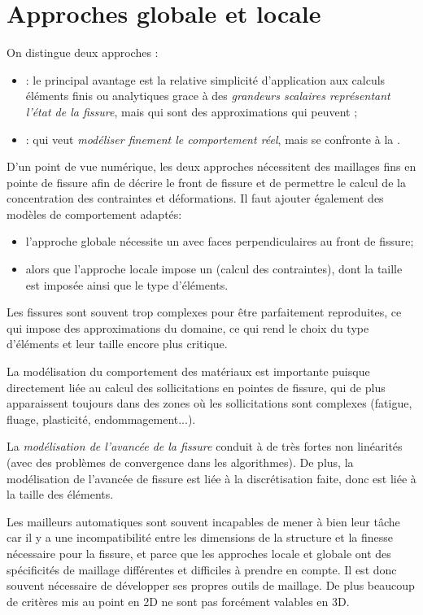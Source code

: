 \section{Approches globale et locale}
On distingue deux approches :
\begin{itemize}
   \item {}: le principal avantage est la relative simplicité d'application
	aux calculs éléments finis ou analytiques grace à des \emph{grandeurs scalaires représentant l'état de
	la fissure}, mais qui sont des approximations qui peuvent ;
   \item {}: qui veut \emph{modéliser finement le comportement réel},
	mais se confronte à la .
\end{itemize}
\medskipvm
D'un point de vue numérique, les deux approches nécessitent des maillages fins en pointe de
fissure afin de décrire le front de fissure et de permettre le calcul de la concentration des contraintes
et déformations.
Il faut ajouter également des modèles de comportement adaptés:
\begin{itemize}
   \item l'approche globale nécessite un  avec faces perpendiculaires
	au front de fissure;
   \item alors que l'approche locale impose un  (calcul des contraintes), dont la
	taille est imposée ainsi que le type d'éléments.
\end{itemize}
\medskipvm
Les fissures sont souvent trop complexes pour être parfaitement reproduites, ce qui impose
des approximations du domaine, ce qui rend le choix du type d'éléments et leur taille encore
plus critique.

La modélisation du comportement des matériaux est importante puisque directement
liée au calcul des sollicitations en pointes de fissure, qui de plus apparaissent toujours dans
des zones où les sollicitations sont complexes (fatigue, fluage, plasticité, endommagement...).

La \emph{modélisation de l'avancée de la fissure} conduit à de très fortes non linéarités
(avec des problèmes de convergence dans les algorithmes).
De plus, la modélisation de l'avancée de fissure est liée à la discrétisation faite, donc est
liée à la taille des éléments.

Les mailleurs automatiques sont souvent incapables de mener à bien leur tâche car
il y a une incompatibilité entre les dimensions de la structure et la finesse nécessaire
pour la fissure, et parce que les approches locale et globale ont des spécificités de maillage
différentes et difficiles à prendre en compte.
Il est donc souvent nécessaire de développer ses propres outils de maillage.
De plus beaucoup de critères mis au point en 2D ne sont pas forcément valables
en 3D.

